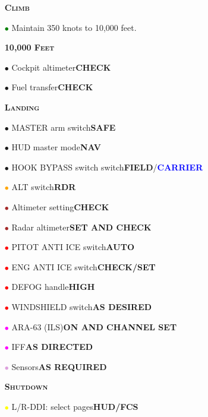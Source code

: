 \documentclass[a4paper,12pt,dvipsnames]{letter}
\newcommand{\button}[1]{\textbf{#1}}
\newcommand{\boat}[1]{\textcolor{Blue}{\textbf{#1}}}
\newcommand{\myHead}[1]{{\LARGE\textsc{\textbf{#1}}}}
\newcommand{\myhead}[1]{{\large\textsc{\textbf{#1}}}}
\newcommand{\bi}{\textcolor{ProcessBlue}{$\bullet$\;}}
\newcommand{\ri}{\textcolor{Red}{$\bullet$\;}}
\newcommand{\gi}{\textcolor{Green}{$\bullet$\;}}
\newcommand{\yi}{\textcolor{Yellow}{$\bullet$\;}}
\newcommand{\vi}{\textcolor{Plum}{$\bullet$\;}}
\newcommand{\mi}{\textcolor{Magenta}{$\bullet$\;}}
\newcommand{\oi}{\textcolor{Orange}{$\bullet$\;}}
\newcommand{\ai}{\textcolor{Apricot}{$\bullet$\;}}
\renewcommand{\ni}{\textcolor{Brown}{$\bullet$\;}}
\begin{document}
{\vspace{0.5em}
\begin{itemize}
 \item[] \myHead{Climb}
 \item[\gi] Maintain 350 knots to 10,000 feet.
 \vspace{0.3em}
 \item[] \myhead{10,000 Feet}
 \item[\ai] Cockpit altimeter\dotfill\button{CHECK}
 \item[\bi] Fuel transfer\dotfill\button{CHECK} 
\end{itemize}
\vspace{0.5em}
\begin{itemize}
 \item[] \myHead{Landing}
 \item[\bi] MASTER arm switch\dotfill\button{SAFE}
 \item[\bi] HUD master mode\dotfill\button{NAV}
 \item[\bi] HOOK BYPASS switch switch\dotfill\button{FIELD}/\boat{CARRIER}
 \item[\oi] ALT switch\dotfill\button{RDR}
 \item[\ni] Altimeter setting\dotfill\button{CHECK}
 \item[\ni] Radar altimeter\dotfill\button{SET AND CHECK}
 \item[\ri] PITOT ANTI ICE switch\dotfill\button{AUTO} 
 \item[\ri] ENG ANTI ICE switch\dotfill\button{CHECK/SET}
 \item[\ri] DEFOG handle\dotfill\button{HIGH}
 \item[\ri] WINDSHIELD switch\dotfill\button{AS DESIRED}
 \item[\mi] ARA-63 (ILS)\dotfill\button{ON AND CHANNEL SET}
 \item[\mi] IFF\dotfill\button{AS DIRECTED}
 \item[\vi] Sensors\dotfill\button{AS REQUIRED}
\end{itemize}
\newpage
\begin{itemize}
 \item[] \myHead{Shutdown}
 \item[\yi] L/R-DDI: select pages\dotfill\button{HUD/FCS}

\end{itemize}}
\end{document}
